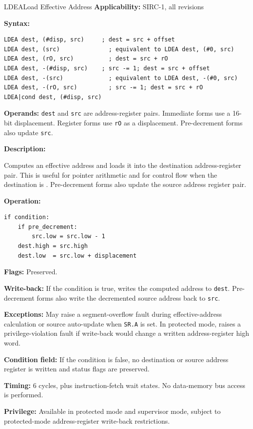 \begin{instructionbox}{LDEA}{Load Effective Address}
	\textbf{Applicability:} SIRC-1, all revisions

	\textbf{Syntax:}
	\begin{lstlisting}
LDEA dest, (#disp, src)     ; dest = src + offset
LDEA dest, (src)              ; equivalent to LDEA dest, (#0, src)
LDEA dest, (rO, src)          ; dest = src + rO
LDEA dest, -(#disp, src)    ; src -= 1; dest = src + offset
LDEA dest, -(src)             ; equivalent to LDEA dest, -(#0, src)
LDEA dest, -(rO, src)         ; src -= 1; dest = src + rO
LDEA|cond dest, (#disp, src)
\end{lstlisting}

	\textbf{Operands:} \texttt{dest} and \texttt{src} are address-register pairs. Immediate forms use a 16-bit
	displacement. Register forms use \texttt{rO} as a displacement. Pre-decrement forms also update \texttt{src}.

	\textbf{Description:}

	Computes an effective address and loads it into the destination address-register pair. This is useful for pointer
	arithmetic and for control flow when the destination is . Pre-decrement forms also update the source address
	register pair.

	\textbf{Operation:}
	\begin{verbatim}
if condition:
    if pre_decrement:
        src.low = src.low - 1
    dest.high = src.high
    dest.low  = src.low + displacement
\end{verbatim}

	\textbf{Flags:} Preserved.

	\textbf{Write-back:} If the condition is true, writes the computed address to \texttt{dest}. Pre-decrement forms also
	write the decremented source address back to \texttt{src}.

	\textbf{Exceptions:} May raise a segment-overflow fault during effective-address calculation or source auto-update when
	\texttt{SR.A} is set. In protected mode, raises a privilege-violation fault if write-back would change a written address-register high word.

	\textbf{Condition field:} If the condition is false, no destination or source address register is written and status
	flags are preserved.

	\textbf{Timing:} 6 cycles, plus instruction-fetch wait states. No data-memory bus access is performed.

	\textbf{Privilege:} Available in protected mode and supervisor mode, subject to protected-mode address-register
	write-back restrictions.


\end{instructionbox}
